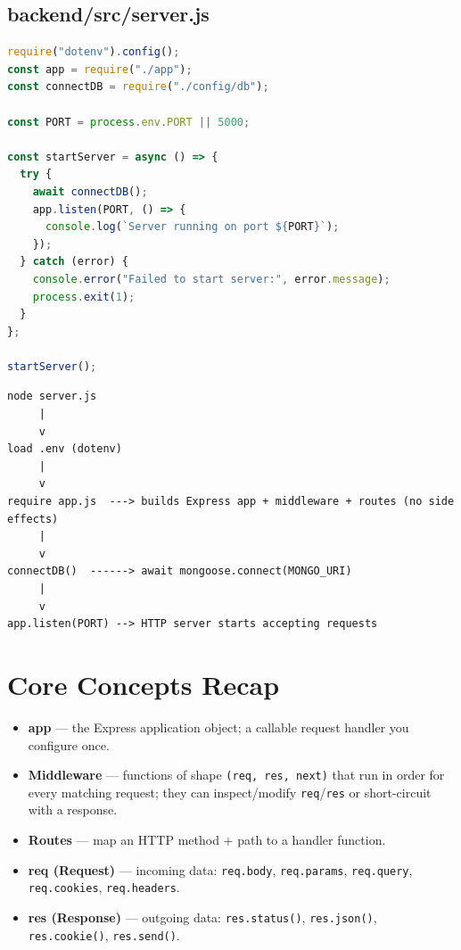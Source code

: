 \subsection{backend/src/server.js}

\begin{lstlisting}[language=JavaScript]
require("dotenv").config();
const app = require("./app");
const connectDB = require("./config/db");

const PORT = process.env.PORT || 5000;

const startServer = async () => {
  try {
    await connectDB();
    app.listen(PORT, () => {
      console.log(`Server running on port ${PORT}`);
    });
  } catch (error) {
    console.error("Failed to start server:", error.message);
    process.exit(1);
  }
};

startServer();
\end{lstlisting}

\begin{diagrambox}
\begin{verbatim}
node server.js
     |
     v
load .env (dotenv)
     |
     v
require app.js  ---> builds Express app + middleware + routes (no side effects)
     |
     v
connectDB()  ------> await mongoose.connect(MONGO_URI)
     |
     v
app.listen(PORT) --> HTTP server starts accepting requests
\end{verbatim}
\end{diagrambox}

\section{Core Concepts Recap}

\begin{itemize}
  \item \textbf{app} --- the Express application object; a callable request handler you configure once.
  \item \textbf{Middleware} --- functions of shape \texttt{(req, res, next)} that run in order for every matching request; they can inspect/modify \texttt{req}/\texttt{res} or short-circuit with a response.
  \item \textbf{Routes} --- map an HTTP method + path to a handler function.
  \item \textbf{req (Request)} --- incoming data: \texttt{req.body}, \texttt{req.params}, \texttt{req.query}, \texttt{req.cookies}, \texttt{req.headers}.
  \item \textbf{res (Response)} --- outgoing data: \texttt{res.status()}, \texttt{res.json()}, \texttt{res.cookie()}, \texttt{res.send()}.
\end{itemize}

